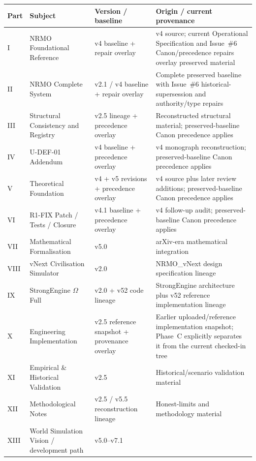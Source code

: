 \begin{center}
\small
\begin{tabular}{p{} p{} p{} p{}}
\toprule
Part & Subject & Version / baseline & Origin / current provenance \\
\midrule
I   & NRMO Foundational Reference
    & v4 baseline + repair overlay
    & v4 source; current Operational Specification and Issue~\#6 Canon/precedence repairs overlay preserved material \\
II  & NRMO Complete System
    & v2.1 / v4 baseline + repair overlay
    & Complete preserved baseline with Issue~\#6 historical-supersession and authority/type repairs \\
III & Structural Consistency and Registry
    & v2.5 lineage + precedence overlay
    & Reconstructed structural material; preserved-baseline Canon precedence applies \\
IV  & U-DEF-01 Addendum
    & v4 baseline + precedence overlay
    & v4 monograph reconstruction; preserved-baseline Canon precedence applies \\
V   & Theoretical Foundation
    & v4 + v5 revisions + precedence overlay
    & v4 source plus later review additions; preserved-baseline Canon precedence applies \\
VI  & R1-FIX Patch / Tests / Closure
    & v4.1 baseline + precedence overlay
    & v4 follow-up audit; preserved-baseline Canon precedence applies \\
VII & Mathematical Formalisation
    & v5.0
    & arXiv-era mathematical integration \\
VIII& vNext Civilisation Simulator
    & v2.0
    & NRMO\_vNext design specification lineage \\
IX  & StrongEngine $\Omega$ Full
    & v2.0 + v52 code lineage
    & StrongEngine architecture plus v52 reference implementation lineage \\
X   & Engineering Implementation
    & v2.5 reference snapshot + provenance overlay
    & Earlier uploaded/reference implementation snapshot; Phase~C explicitly separates it from the current checked-in tree \\
XI  & Empirical \& Historical Validation
    & v2.5
    & Historical/scenario validation material \\
XII & Methodological Notes
    & v2.5 / v5.5 reconstruction lineage
    & Honest-limits and methodology material \\
XIII& World Simulation Vision / development path
    & v5.0--v7.1

\end{tabular}
\end{center}
